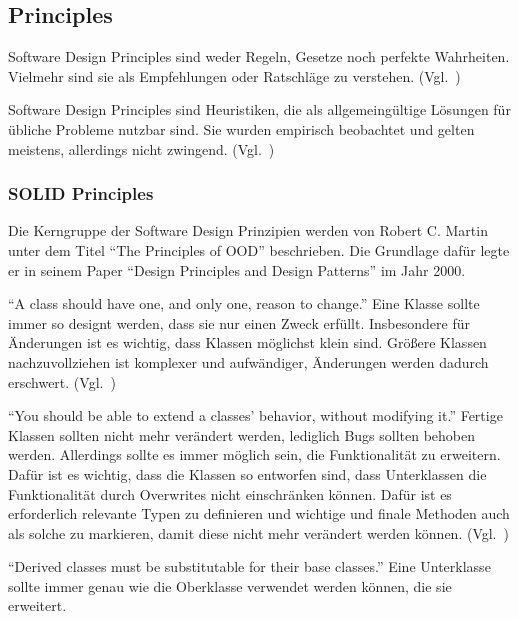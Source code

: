 \subsection{Principles}
Software Design Principles sind weder Regeln, Gesetze noch perfekte Wahrheiten.
Vielmehr sind sie als Empfehlungen oder Ratschläge zu verstehen.
(Vgl.~\cite{getting-a-solid-start})

Software Design Principles sind Heuristiken, die als allgemeingültige Lösungen für übliche Probleme nutzbar sind.
Sie wurden empirisch beobachtet und gelten meistens, allerdings nicht zwingend.
(Vgl.~\cite{getting-a-solid-start})

\subsubsection{SOLID Principles}
Die Kerngruppe der Software Design Prinzipien werden von Robert C. Martin unter dem Titel \enquote{The Principles of OOD}\cite{solid} beschrieben.
Die Grundlage dafür legte er in seinem Paper \enquote{Design Principles and Design Patterns}\cite{design-principles-and-design-patterns} im Jahr 2000.

\enquote{A class should have one, and only one, reason to change.}\cite{solid}
Eine Klasse sollte immer so designt werden, dass sie nur einen Zweck erfüllt\cite{different-types-of-software-design-principles}.
Insbesondere für Änderungen ist es wichtig, dass Klassen möglichst klein sind.
Größere Klassen nachzuvollziehen ist komplexer und aufwändiger, Änderungen werden dadurch erschwert.
(Vgl.~\cite{clean-code})

\enquote{You should be able to extend a classes' behavior, without modifying it.}\cite{solid}
Fertige Klassen sollten nicht mehr verändert werden, lediglich Bugs sollten behoben werden.
Allerdings sollte es immer möglich sein, die Funktionalität zu erweitern.
Dafür ist es wichtig, dass die Klassen so entworfen sind, dass Unterklassen die Funktionalität durch Overwrites nicht einschränken können.
Dafür ist es erforderlich relevante Typen zu definieren und wichtige und finale Methoden auch als solche zu markieren, damit diese nicht mehr verändert werden können.
(Vgl.~\cite{different-types-of-software-design-principles})

\newpage

\enquote{Derived classes must be substitutable for their base classes.}\cite{solid}
Eine Unterklasse sollte immer genau wie die Oberklasse verwendet werden können, die sie erweitert\cite{different-types-of-software-design-principles}.

